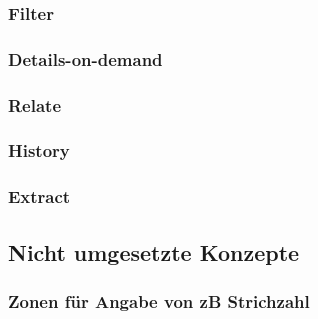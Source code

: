 \subsubsection{Filter}
\subsubsection{Details-on-demand}
\subsubsection{Relate}
\subsubsection{History}
\subsubsection{Extract}

\subsection{Nicht umgesetzte Konzepte}
\subsubsection{Zonen für Angabe von zB Strichzahl}